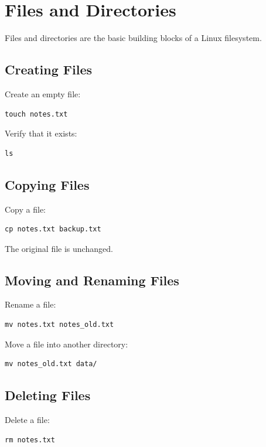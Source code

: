 \section{Files and Directories}

Files and directories are the basic building blocks of a Linux filesystem.

\subsection{Creating Files}

Create an empty file:

\begin{lstlisting}
touch notes.txt
\end{lstlisting}

Verify that it exists:

\begin{lstlisting}
ls
\end{lstlisting}

\subsection{Copying Files}

Copy a file:

\begin{lstlisting}
cp notes.txt backup.txt
\end{lstlisting}

The original file is unchanged.

\subsection{Moving and Renaming Files}

Rename a file:

\begin{lstlisting}
mv notes.txt notes_old.txt
\end{lstlisting}

Move a file into another directory:

\begin{lstlisting}
mv notes_old.txt data/
\end{lstlisting}

\subsection{Deleting Files}

Delete a file:

\begin{lstlisting}
rm notes.txt
\end{lstlisting}

